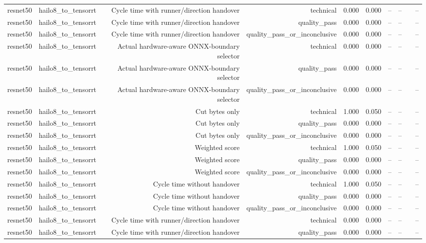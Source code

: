 \begin{table}[t]
\begin{tabular}{lrrrrrrrrr}
resnet50 & hailo8\_to\_tensorrt & Cycle time with runner/direction handover & technical & 0.000 & 0.000 & -- & -- &  & -- \\
resnet50 & hailo8\_to\_tensorrt & Cycle time with runner/direction handover & quality\_pass & 0.000 & 0.000 & -- & -- &  & -- \\
resnet50 & hailo8\_to\_tensorrt & Cycle time with runner/direction handover & quality\_pass\_or\_inconclusive & 0.000 & 0.000 & -- & -- &  & -- \\
resnet50 & hailo8\_to\_tensorrt & Actual hardware-aware ONNX-boundary selector & technical & 0.000 & 0.000 & -- & -- &  & -- \\
resnet50 & hailo8\_to\_tensorrt & Actual hardware-aware ONNX-boundary selector & quality\_pass & 0.000 & 0.000 & -- & -- &  & -- \\
resnet50 & hailo8\_to\_tensorrt & Actual hardware-aware ONNX-boundary selector & quality\_pass\_or\_inconclusive & 0.000 & 0.000 & -- & -- &  & -- \\
resnet50 & hailo8\_to\_tensorrt & Cut bytes only & technical & 1.000 & 0.050 & -- & -- &  & -- \\
resnet50 & hailo8\_to\_tensorrt & Cut bytes only & quality\_pass & 0.000 & 0.000 & -- & -- &  & -- \\
resnet50 & hailo8\_to\_tensorrt & Cut bytes only & quality\_pass\_or\_inconclusive & 0.000 & 0.000 & -- & -- &  & -- \\
resnet50 & hailo8\_to\_tensorrt & Weighted score & technical & 1.000 & 0.050 & -- & -- &  & -- \\
resnet50 & hailo8\_to\_tensorrt & Weighted score & quality\_pass & 0.000 & 0.000 & -- & -- &  & -- \\
resnet50 & hailo8\_to\_tensorrt & Weighted score & quality\_pass\_or\_inconclusive & 0.000 & 0.000 & -- & -- &  & -- \\
resnet50 & hailo8\_to\_tensorrt & Cycle time without handover & technical & 1.000 & 0.050 & -- & -- &  & -- \\
resnet50 & hailo8\_to\_tensorrt & Cycle time without handover & quality\_pass & 0.000 & 0.000 & -- & -- &  & -- \\
resnet50 & hailo8\_to\_tensorrt & Cycle time without handover & quality\_pass\_or\_inconclusive & 0.000 & 0.000 & -- & -- &  & -- \\
resnet50 & hailo8\_to\_tensorrt & Cycle time with runner/direction handover & technical & 0.000 & 0.000 & -- & -- &  & -- \\
resnet50 & hailo8\_to\_tensorrt & Cycle time with runner/direction handover & quality\_pass & 0.000 & 0.000 & -- & -- &  & -- \\

\end{tabular}
\end{table}
